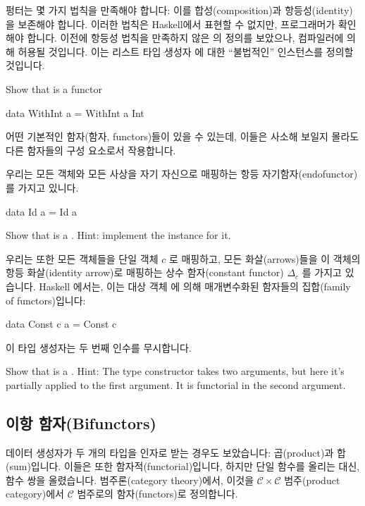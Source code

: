 \documentclass[DaoFP]{subfiles}
\begin{document}
펑터는 몇 가지 법칙을 만족해야 합니다: 이를 합성(composition)과 항등성(identity)을 보존해야 합니다. 이러한 법칙은 Haskell에서 표현할 수 없지만, 프로그래머가 확인해야 합니다. 이전에 항등성 법칙을 만족하지 않은 의 정의를 보았으나, 컴파일러에 의해 허용될 것입니다. 이는 리스트 타입 생성자 \hask{[]}에 대한 ``불법적인''  인스턴스를 정의할 것입니다.

\begin{exercise}
Show that  is a functor
\begin{haskell}
data WithInt a = WithInt a Int
\end{haskell}
\end{exercise}

어떤 기본적인 함자(함자, functors)들이 있을 수 있는데, 이들은 사소해 보일지 몰라도 다른 함자들의 구성 요소로서 작용합니다.

우리는 모든 객체와 모든 사상을 자기 자신으로 매핑하는 항등 자기함자(endofunctor)를 가지고 있니다.
\begin{haskell}
data Id a = Id a
\end{haskell}
\begin{exercise}
Show that  is a . Hint: implement the  instance for it.
\end{exercise}


우리는 또한 모든 객체들을 단일 객체 $c$ 로 매핑하고, 모든 화살(arrows)들을 이 객체의 항등 화살(identity arrow)로 매핑하는 상수 함자(constant functor) $\Delta_c$ 를 가지고 있습니다. Haskell 에서는, 이는 대상 객체  에 의해 매개변수화된 함자들의 집합(family of functors)입니다:
\begin{haskell}
data Const c a = Const c
\end{haskell}
이 타입 생성자는 두 번째 인수를 무시합니다.


\begin{exercise}
Show that  is a . Hint: The type constructor takes two arguments, but here it's partially applied to the first argument. It is functorial in the second argument.
\end{exercise}


\subsection{이항 함자(Bifunctors)}

데이터 생성자가 두 개의 타입을 인자로 받는 경우도 보았습니다: 곱(product)과 합(sum)입니다. 이들은 또한 함자적(functorial)입니다, 하지만 단일 함수를 올리는 대신, 함수 쌍을 올렸습니다. 범주론(category theory)에서, 이것을 $\mathcal{C} \times \mathcal{C}$ 범주(product category)에서 $\mathcal{C}$ 범주로의 함자(functors)로 정의합니다.
\end{document}
